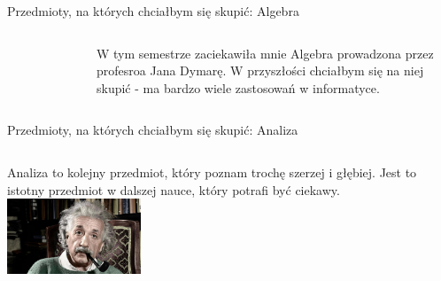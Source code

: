 \documentclass{beamer}
\begin{document}
\begin{frame}{Przedmioty, na których chciałbym się skupić: Algebra}
\begin{columns}
\begin{figure}
\centering
{}
\end{figure}
W tym semestrze zaciekawiła mnie Algebra prowadzona przez profesroa Jana Dymarę. W przyszłości chciałbym się na niej skupić - ma bardzo wiele zastosowań w informatyce.
\end{columns}
\end{frame}

\begin{frame}{Przedmioty, na których chciałbym się skupić: Analiza}
\begin{columns}
Analiza to kolejny przedmiot, który poznam trochę szerzej i głębiej. Jest to istotny przedmiot w dalszej nauce, który potrafi być ciekawy.
\includegraphics[width=4cm]{zdjj.jpg}
\end{columns}
\end{frame}
\end{document}
